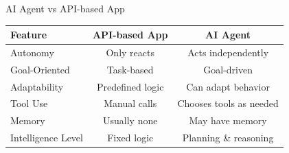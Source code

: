 \documentclass[10pt]{beamer}
\newcommand{\cmark}{\textcolor{green!70!black}{\ding{51}}} %
\newcommand{\xmark}{\textcolor{red}{\ding{55}}}             %
\begin{document}
\begin{frame}{AI Agent vs API-based App}
    \begin{table}[h!]
    \centering
    \renewcommand{\arraystretch}{1.3}
    \begin{tabular}{|l|c|c|}
    \hline
    \textbf{Feature} & \textbf{API-based App} & \textbf{AI Agent} \\
    \hline
    Autonomy & \xmark{} Only reacts & \cmark{} Acts independently \\
    Goal-Oriented & \xmark{} Task-based & \cmark{} Goal-driven \\
    Adaptability & \xmark{} Predefined logic & \cmark{} Can adapt behavior \\
    Tool Use & \cmark{} Manual calls & \cmark{} Chooses tools as needed \\
    Memory & \xmark{} Usually none & \cmark{} May have memory \\
    Intelligence Level & \xmark{} Fixed logic & \cmark{} Planning \& reasoning \\
    \hline
    \end{tabular}
    \end{table}
    \end{frame}
\end{document}
